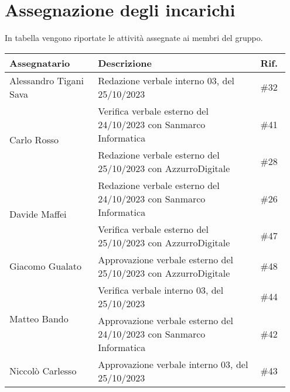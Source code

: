 \section{Assegnazione degli incarichi}
In tabella vengono riportate le attività assegnate ai membri del gruppo.
\begin{center}
    {
    \renewcommand{\arraystretch}{1.5}
    \begin{tabular}{p{0.30\linewidth}|p{0.55\linewidth}|p{0.10\linewidth}}
		\textbf{Assegnatario}   		&   \textbf{Descrizione}   & \textbf{Rif.}     \\
		\hline
		Alessandro Tigani Sava  		& Redazione verbale interno 03, del 25/10/2023 							& \#32 	\\
		\hline
		\multirow{2}{*}{Carlo Rosso}	& Verifica verbale esterno del 24/10/2023 con Sanmarco Informatica      & \#41 	\\
		\cline{2-3}
										& Redazione verbale esterno del 25/10/2023 con AzzurroDigitale	        & \#28 	\\
		\hline
		\multirow{2}{*}{Davide Maffei}	& Redazione verbale esterno del 24/10/2023 con Sanmarco Informatica	    & \#26 	\\
		\cline{2-3}
										& Verifica verbale esterno del 25/10/2023 con AzzurroDigitale           & \#47 	\\
		\hline
		Giacomo Gualato					& Approvazione verbale esterno del 25/10/2023 con AzzurroDigitale	    & \#48 	\\
		\hline
		\multirow{2}{*}{Matteo Bando}	& Verifica verbale interno 03, del 25/10/2023							& \#44 	\\
		\cline{2-3}
										& Approvazione verbale esterno del 24/10/2023 con Sanmarco Informatica	& \#42 	\\
		\hline
		Niccolò Carlesso				& Approvazione verbale interno 03, del 25/10/2023 						& \#43 	\\
    \end{tabular}
    }
\end{center}